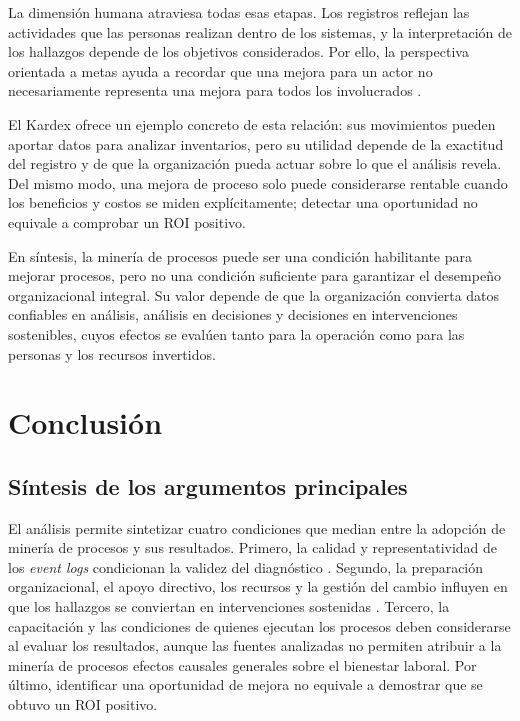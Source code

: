 \documentclass{article}
\begin{document}
    La dimensión humana atraviesa todas esas etapas. Los registros reflejan las actividades que las personas realizan dentro de los sistemas, y la interpretación de los hallazgos depende de los objetivos considerados. Por ello, la perspectiva orientada a metas ayuda a recordar que una mejora para un actor no necesariamente representa una mejora para todos los involucrados \cite{ghasemi2020eventlogs}.

    El Kardex ofrece un ejemplo concreto de esta relación: sus movimientos pueden aportar datos para analizar inventarios, pero su utilidad depende de la exactitud del registro y de que la organización pueda actuar sobre lo que el análisis revela. Del mismo modo, una mejora de proceso solo puede considerarse rentable cuando los beneficios y costos se miden explícitamente; detectar una oportunidad no equivale a comprobar un ROI positivo.

    En síntesis, la minería de procesos puede ser una condición habilitante para mejorar procesos, pero no una condición suficiente para garantizar el desempeño organizacional integral. Su valor depende de que la organización convierta datos confiables en análisis, análisis en decisiones y decisiones en intervenciones sostenibles, cuyos efectos se evalúen tanto para la operación como para las personas y los recursos invertidos.

    \section{Conclusión}
    \subsection{Síntesis de los argumentos principales}

    El análisis permite sintetizar cuatro condiciones que median entre la adopción de minería de procesos y sus resultados. Primero, la calidad y representatividad de los \textit{event logs} condicionan la validez del diagnóstico \cite{marin-castro2021preprocessing,eventloggeneration2026}. Segundo, la preparación organizacional, el apoyo directivo, los recursos y la gestión del cambio influyen en que los hallazgos se conviertan en intervenciones sostenidas \cite{processminingmaturity2024,talo2025erp}. Tercero, la capacitación y las condiciones de quienes ejecutan los procesos deben considerarse al evaluar los resultados, aunque las fuentes analizadas no permiten atribuir a la minería de procesos efectos causales generales sobre el bienestar laboral. Por último, identificar una oportunidad de mejora no equivale a demostrar que se obtuvo un ROI positivo.
\end{document}
